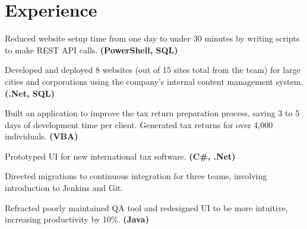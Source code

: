 \documentclass[letterpaper]{kevin-resume} %
\begin{document}
\begin{minipage}[t]{0.63\textwidth} %


\section{Experience}

\vspace{\topsep} %
\begin{tightitemize}
	\item Reduced website setup time from one day to under 30 minutes by writing scripts to make REST API calls. \textbf{(PowerShell, SQL)}
	\item Developed and deployed 8 websites (out of 15 sites total from the team) for large cities and corporations using the company's internal content management system. \textbf{(.Net, SQL)}
\end{tightitemize}

\sectionspace %


\begin{tightitemize}
	\item Built an application to improve the tax return preparation process, saving 3 to 5 days of development time per client. Generated tax returns for over 4,000 individuals. \textbf{(VBA)}
	\item Prototyped UI for new international tax software. \textbf{(C\#, .Net)}
\end{tightitemize}

\sectionspace %


\begin{tightitemize}
	\item Directed migrations to continuous integration for three teams, involving introduction to Jenkins and Git.
	\item Refracted poorly maintained QA tool and redesigned UI to be more intuitive, increasing productivity by 10\%. \textbf{(Java)}
\end{tightitemize}


\end{minipage}
\end{document}
